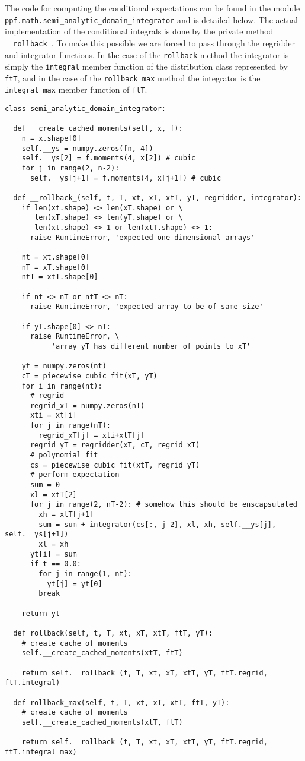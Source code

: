 The code for computing the conditional expectations can be found in
the module \verb|ppf.math.semi_analytic_domain_integrator| and is
detailed below. The actual implementation of the conditional integrals is 
done by the private method \verb|__rollback_|. To make this possible we 
are forced to pass through the regridder and integrator functions. In the 
case of the \verb|rollback| method the integrator is simply the \verb|integral| 
member function of the distribution class represented by \verb|ftT|, and 
in the case of the \verb|rollback_max| method the integrator is the 
\verb|integral_max| member function of \verb|ftT|.
\begin{verbatim}
class semi_analytic_domain_integrator:
    
  def __create_cached_moments(self, x, f):
    n = x.shape[0]
    self.__ys = numpy.zeros([n, 4])
    self.__ys[2] = f.moments(4, x[2]) # cubic
    for j in range(2, n-2):
      self.__ys[j+1] = f.moments(4, x[j+1]) # cubic

  def __rollback_(self, t, T, xt, xT, xtT, yT, regridder, integrator):
    if len(xt.shape) <> len(xT.shape) or \
       len(xT.shape) <> len(yT.shape) or \
       len(xt.shape) <> 1 or len(xtT.shape) <> 1:
      raise RuntimeError, 'expected one dimensional arrays'

    nt = xt.shape[0]
    nT = xT.shape[0]
    ntT = xtT.shape[0]

    if nt <> nT or ntT <> nT:
      raise RuntimeError, 'expected array to be of same size'

    if yT.shape[0] <> nT:
      raise RuntimeError, \
           'array yT has different number of points to xT'

    yt = numpy.zeros(nt)
    cT = piecewise_cubic_fit(xT, yT)
    for i in range(nt):
      # regrid
      regrid_xT = numpy.zeros(nT)
      xti = xt[i]
      for j in range(nT):
        regrid_xT[j] = xti+xtT[j]
      regrid_yT = regridder(xT, cT, regrid_xT)
      # polynomial fit
      cs = piecewise_cubic_fit(xtT, regrid_yT)
      # perform expectation
      sum = 0
      xl = xtT[2]
      for j in range(2, nT-2): # somehow this should be enscapsulated
        xh = xtT[j+1]
        sum = sum + integrator(cs[:, j-2], xl, xh, self.__ys[j], self.__ys[j+1])
        xl = xh
      yt[i] = sum
      if t == 0.0:
        for j in range(1, nt):
          yt[j] = yt[0]
        break

    return yt
    
  def rollback(self, t, T, xt, xT, xtT, ftT, yT):
    # create cache of moments
    self.__create_cached_moments(xtT, ftT)    

    return self.__rollback_(t, T, xt, xT, xtT, yT, ftT.regrid, ftT.integral)

  def rollback_max(self, t, T, xt, xT, xtT, ftT, yT):
    # create cache of moments
    self.__create_cached_moments(xtT, ftT)    

    return self.__rollback_(t, T, xt, xT, xtT, yT, ftT.regrid, ftT.integral_max)
\end{verbatim}
